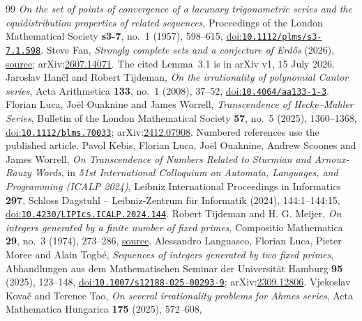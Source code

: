 \documentclass[11pt]{article}
\begin{document}
\begin{thebibliography}{99}
  \emph{On the set of points of convergence of a lacunary trigonometric series and the equidistribution properties of related sequences}, Proceedings of the London Mathematical Society \textbf{s3-7}, no.~1 (1957), 598--615,
  \href{https://doi.org/10.1112/plms/s3-7.1.598}{doi:\nolinkurl{10.1112/plms/s3-7.1.598}}.
 Steve Fan,
  \emph{Strongly complete sets and a conjecture of Erd\H{o}s} (2026),
  \href{https://arxiv.org/abs/2607.14071v1}{source}; arXiv:\href{https://arxiv.org/abs/2607.14071}{2607.14071}. The cited Lemma~3.1 is in arXiv v1, 15 July 2026.
 Jaroslav Han\v{c}l and Robert Tijdeman,
  \emph{On the irrationality of polynomial Cantor series}, Acta Arithmetica \textbf{133}, no.~1 (2008), 37--52,
  \href{https://doi.org/10.4064/aa133-1-3}{doi:\nolinkurl{10.4064/aa133-1-3}}.
 Florian Luca, Jo\"{e}l Ouaknine and James Worrell,
  \emph{Transcendence of Hecke--Mahler Series}, Bulletin of the London Mathematical Society \textbf{57}, no.~5 (2025), 1360--1368,
  \href{https://doi.org/10.1112/blms.70033}{doi:\nolinkurl{10.1112/blms.70033}}; arXiv:\href{https://arxiv.org/abs/2412.07908}{2412.07908}. Numbered references use the published article.
 Pavol Kebis, Florian Luca, Jo\"{e}l Ouaknine, Andrew Scoones and James Worrell,
  \emph{On Transcendence of Numbers Related to Sturmian and Arnoux-Rauzy Words}, in \emph{51st International Colloquium on Automata, Languages, and Programming (ICALP 2024)}, Leibniz International Proceedings in Informatics \textbf{297}, Schloss Dagstuhl -- Leibniz-Zentrum f\"{u}r Informatik (2024), 144:1--144:15,
  \href{https://doi.org/10.4230/LIPIcs.ICALP.2024.144}{doi:\nolinkurl{10.4230/LIPIcs.ICALP.2024.144}}.
 Robert Tijdeman and H. G. Meijer,
  \emph{On integers generated by a finite number of fixed primes}, Compositio Mathematica \textbf{29}, no.~3 (1974), 273--286,
  \href{https://www.numdam.org/article/CM_1974__29_3_273_0.pdf}{source}.
 Alessandro Languasco, Florian Luca, Pieter Moree and Alain Togb\'{e},
  \emph{Sequences of integers generated by two fixed primes}, Abhandlungen aus dem Mathematischen Seminar der Universität Hamburg \textbf{95} (2025), 123--148,
  \href{https://doi.org/10.1007/s12188-025-00293-9}{doi:\nolinkurl{10.1007/s12188-025-00293-9}}; arXiv:\href{https://arxiv.org/abs/2309.12806}{2309.12806}.
 Vjekoslav Kova\v{c} and Terence Tao,
  \emph{On several irrationality problems for Ahmes series}, Acta Mathematica Hungarica \textbf{175} (2025), 572--608,

\end{thebibliography}
\end{document}
